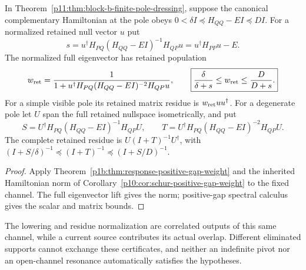 \documentclass[12pt,a4paper]{article}
\begin{document}
\begin{corollary}
\label{p11:cor:schur-positive-gap-weight}
In Theorem~\ref{p11:thm:block-b-finite-pole-dressing}, suppose the
canonical complementary Hamiltonian at the pole obeys
$0<\delta I\preceq H_{QQ}-EI\preceq DI$.
For a normalized retained null vector $u$ put
\[
 s=u^\dagger H_{PQ}(H_{QQ}-EI)^{-1}H_{QP}u
   =u^\dagger H_{PP}u-E.
\]
The normalized full eigenvector has retained population
\[
 w_{\rm ret}
 =\frac{1}{1+u^\dagger H_{PQ}(H_{QQ}-EI)^{-2}H_{QP}u},
 \qquad
 \boxed{\frac{\delta}{\delta+s}\le w_{\rm ret}
                         \le\frac{D}{D+s}.}
\]
For a simple visible pole its retained matrix residue is
$w_{\rm ret}uu^\dagger$.  For a degenerate pole let $U$ span the full
retained nullspace isometrically, and put
\[
 S=U^\dagger H_{PQ}(H_{QQ}-EI)^{-1}H_{QP}U,\qquad
 T=U^\dagger H_{PQ}(H_{QQ}-EI)^{-2}H_{QP}U.
\]
The complete retained residue is $U(I+T)^{-1}U^\dagger$, with
$(I+S/\delta)^{-1}\preceq(I+T)^{-1}\preceq(I+S/D)^{-1}$.
\end{corollary}
\begin{proof}
Apply Theorem~\ref{p1b:thm:response-positive-gap-weight} and the
inherited Hamiltonian norm of
Corollary~\ref{p10:cor:schur-positive-gap-weight} to the fixed channel.
The full eigenvector lift gives the norm; positive-gap spectral calculus
gives the scalar and matrix bounds.
\end{proof}
The lowering and residue normalization are correlated outputs of this
same channel, while a current source contributes its actual overlap.
Different eliminated supports cannot exchange these certificates, and
neither an indefinite pivot nor an open-channel resonance automatically
satisfies the hypotheses.
\end{document}
